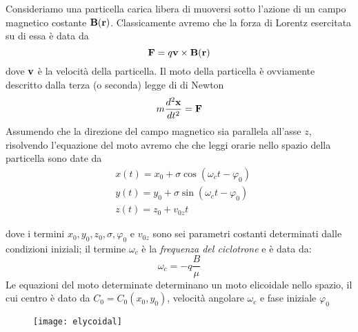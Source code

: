 Consideriamo una particella carica libera di muoversi sotto l'azione di un campo magnetico costante $\bold{B}(\bold{r})$. Classicamente avremo che la forza di Lorentz esercitata su di essa \`e data da 
\begin{equation*}
	\bold{F} = q\bold{v} \times \bold{B}(\bold{r})
\end{equation*}
dove $\bold{v}$ \`e la velocit\`a della particella. Il moto della particella \`e ovviamente descritto dalla terza (o seconda) legge di di Newton
\begin{equation*}
	m \frac{d^2\bold{x}}{dt^2}= \bold{F}
\end{equation*}
Assumendo che la direzione del campo magnetico sia parallela all'asse $z$, risolvendo l'equazione del moto avremo che che leggi orarie nello spazio della particella sono date da 
\begin{align*}
	&x(t) =x_0 + \sigma \cos (\omega_ct - \varphi_0) \\[0.3cm]
	&y(t) = y_0 + \sigma \sin(\omega_ct - \varphi_0)\\[0.3cm]
	&z(t) = z_0 + v_{0z}t
\end{align*}
\newpage 


dove i termini $x_0,y_0,z_0,\sigma,\varphi_0$ e $v_{0z}$ sono sei parametri costanti determinati dalle condizioni iniziali; il termine $\omega_c$ \`e la \textit{frequenza del ciclotrone} e \`e data da:
\begin{equation*}
	\omega_c = -q \frac{B}{\mu}
\end{equation*}
Le equazioni del moto determinate determinano un moto elicoidale nello spazio, il cui centro \`e dato da $C_0 = C_0(x_0,y_0)$, velocit\`a angolare $\omega_c$ e fase iniziale $\varphi_0$

\begin{figure}[!ht]
\vspace{0.1in}
\texttt{[image: elycoidal]}	
\centering
\vspace{0.1in}
\end{figure}

